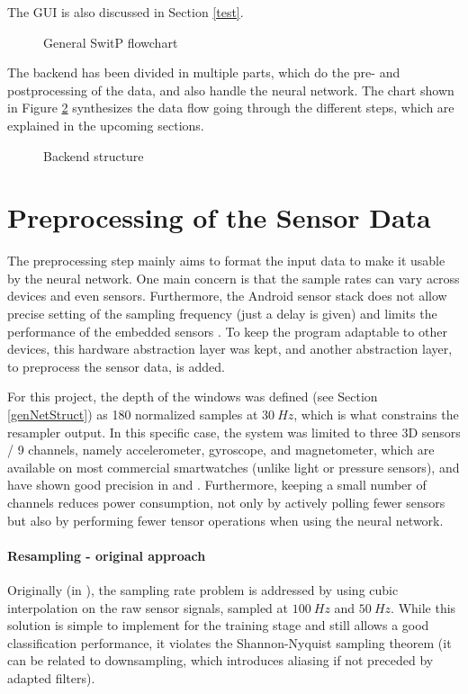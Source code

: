 \documentclass[a4paper, oneside]{discothesis}
\begin{document}
The GUI is also discussed in Section \ref{test}.
\begin{figure}[H]
  \centering
  
  \caption{General SwitP flowchart}\label{fig:flowchart}
\end{figure}

The backend has been divided in multiple parts, which do the pre- and postprocessing of the data, and also handle the neural network. The chart shown in Figure \ref{fig:backendstruct} synthesizes the data flow going through the different steps, which are explained in the upcoming sections.
\begin{figure}[H]
  \centering
  
  \label{fig:backendstruct}
  \caption{Backend structure}
\end{figure}

\section{Preprocessing of the Sensor Data}\label{PreProc}
The preprocessing step mainly aims to format the input data to make it usable by the neural network. One main concern is that the sample rates can vary across devices and even sensors. Furthermore, the Android sensor stack \cite{SensStack20} does not allow precise setting of the sampling frequency (just a delay is given) and limits the performance of the embedded sensors \cite{SPAC+18}. To keep the program adaptable to other devices, this hardware abstraction layer was kept, and another abstraction layer, to preprocess the sensor data, is added.

For this project, the depth of the windows was defined (see Section \ref{genNetStruct}) as 180 normalized samples at $30~Hz$, which is what constrains the resampler output. In this specific case, the system was limited to three 3D sensors / 9 channels, namely accelerometer, gyroscope, and magnetometer, which are available on most commercial smartwatches (unlike light or pressure sensors), and have shown good precision in \cite{WANG19} and \cite{BMSW19}. Furthermore, keeping a small number of channels reduces power consumption, not only by actively polling fewer sensors but also by performing fewer tensor operations when using the neural network.

\paragraph{Resampling - original approach} Originally (in \cite{BMSW19}), the sampling rate problem is addressed by using cubic interpolation on the raw sensor signals, sampled at $100~Hz$ and $50~Hz$. While this solution is simple to implement for the training stage and still allows a good classification performance, it violates the Shannon-Nyquist sampling theorem (it can be related to downsampling, which introduces aliasing if not preceded by adapted filters).
\end{document}
